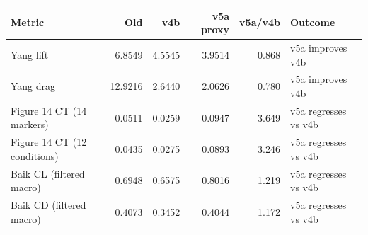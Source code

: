 \begin{tabular}{lrrrrl}
\toprule
Metric & Old & v4b & v5a proxy & v5a/v4b & Outcome \\
\midrule
Yang lift & 6.8549 & 4.5545 & 3.9514 & 0.868 & v5a improves v4b \\
Yang drag & 12.9216 & 2.6440 & 2.0626 & 0.780 & v5a improves v4b \\
Figure 14 CT (14 markers) & 0.0511 & 0.0259 & 0.0947 & 3.649 & v5a regresses vs v4b \\
Figure 14 CT (12 conditions) & 0.0435 & 0.0275 & 0.0893 & 3.246 & v5a regresses vs v4b \\
Baik CL (filtered macro) & 0.6948 & 0.6575 & 0.8016 & 1.219 & v5a regresses vs v4b \\
Baik CD (filtered macro) & 0.4073 & 0.3452 & 0.4044 & 1.172 & v5a regresses vs v4b \\
\bottomrule
\end{tabular}
